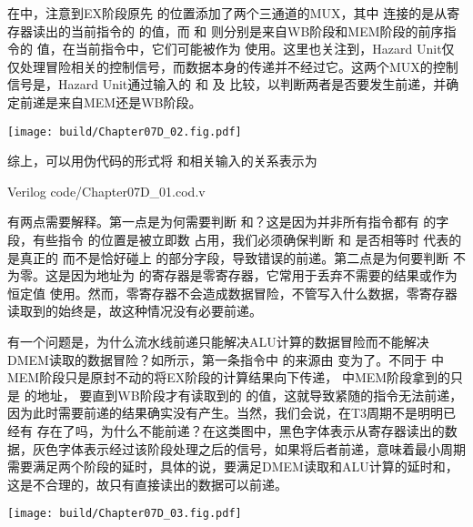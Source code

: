 在中，注意到EX阶段原先 的位置添加了两个三通道的MUX，其中 连接的是从寄存器读出的当前指令的 的值，而 和 则分别是来自WB阶段和MEM阶段的前序指令的 值，在当前指令中，它们可能被作为 使用。这里也关注到，Hazard Unit仅仅处理冒险相关的控制信号，而数据本身的传递并不经过它。这两个MUX的控制信号是，Hazard Unit通过输入的 和 及 比较，以判断两者是否要发生前递，并确定前递是来自MEM还是WB阶段。

\begin{Figure}[流水线前递]
    \texttt{[image: build/Chapter07D\_02.fig.pdf]}
\end{Figure}

综上，可以用伪代码的形式将 和相关输入的关系表示为
\begin{Code}[流水线前递的伪代码表示]{Verilog}
    code/Chapter07D_01.cod.v
\end{Code}

有两点需要解释。第一点是为何需要判断 和？这是因为并非所有指令都有 的字段，有些指令 的位置是被立即数 占用，我们必须确保判断 和 是否相等时 代表的是真正的 而不是恰好碰上 的部分字段，导致错误的前递。第二点是为何要判断 不为零。这是因为地址为 的寄存器是零寄存器，它常用于丢弃不需要的结果或作为恒定值 使用。然而，零寄存器不会造成数据冒险，不管写入什么数据，零寄存器读取到的始终是，故这种情况没有必要前递。

有一个问题是，为什么流水线前递只能解决ALU计算的数据冒险而不能解决DMEM读取的数据冒险？如所示，第一条指令中 的来源由 变为了。不同于 中MEM阶段只是原封不动的将EX阶段的计算结果向下传递， 中MEM阶段拿到的只是 的地址， 要直到WB阶段才有读取到的 的值，这就导致紧随的指令无法前递，因为此时需要前递的结果确实没有产生。当然，我们会说，在T3周期不是明明已经有 存在了吗，为什么不能前递？在这类图中，黑色字体表示从寄存器读出的数据，灰色字体表示经过该阶段处理之后的信号，如果将后者前递，意味着最小周期需要满足两个阶段的延时，具体的说，要满足DMEM读取和ALU计算的延时和，这是不合理的，故只有直接读出的数据可以前递。
 
\begin{Figure}[流水线前递无法用于DMEM读取导致的数据冒险]
    \texttt{[image: build/Chapter07D\_03.fig.pdf]}
\end{Figure}

